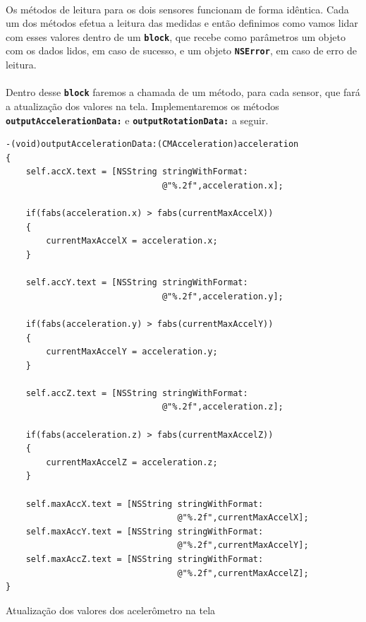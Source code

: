 \documentclass[a4paper,12pt,brazil,doubleside]{book}
\begin{document}
\begin{singlespace}
\paragraph{}Os métodos de leitura para os dois sensores funcionam de forma idêntica. Cada um dos métodos efetua a leitura das medidas e então definimos como vamos lidar com esses valores dentro de um \texttt{\textbf{block}}, que recebe como parâmetros um objeto com os dados lidos, em caso de sucesso, e um objeto \texttt{\textbf{NSError}}, em caso de erro de leitura.
\paragraph{}Dentro desse \texttt{\textbf{block}} faremos a chamada de um método, para cada sensor, que fará a atualização dos valores na tela. Implementaremos os métodos \texttt{\textbf{outputAccelerationData:}} e \texttt{\textbf{outputRotationData:}} a seguir.

\begin{listing}[H]
\begin{verbatim}
-(void)outputAccelerationData:(CMAcceleration)acceleration
{
    self.accX.text = [NSString stringWithFormat:
                               @"%.2f",acceleration.x];
    
    if(fabs(acceleration.x) > fabs(currentMaxAccelX))
    {
        currentMaxAccelX = acceleration.x;
    }
    
    self.accY.text = [NSString stringWithFormat:
                               @"%.2f",acceleration.y];
    
    if(fabs(acceleration.y) > fabs(currentMaxAccelY))
    {
        currentMaxAccelY = acceleration.y;
    }
    
    self.accZ.text = [NSString stringWithFormat:
                               @"%.2f",acceleration.z];
    
    if(fabs(acceleration.z) > fabs(currentMaxAccelZ))
    {
        currentMaxAccelZ = acceleration.z;
    }
    
    self.maxAccX.text = [NSString stringWithFormat:
                                  @"%.2f",currentMaxAccelX];
    self.maxAccY.text = [NSString stringWithFormat:
                                  @"%.2f",currentMaxAccelY];
    self.maxAccZ.text = [NSString stringWithFormat:
                                  @"%.2f",currentMaxAccelZ];
}
\end{verbatim}
\caption{Atualização dos valores dos acelerômetro na tela}
\end{listing}


\end{singlespace}
\end{document}
